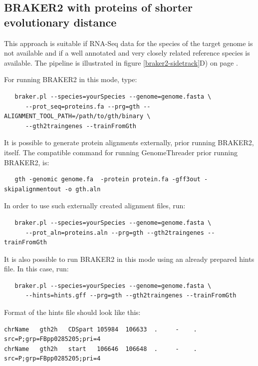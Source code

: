 \documentclass[a4paper,10pt]{report}
\begin{document}
\subsection{BRAKER2 with proteins of shorter evolutionary distance}\label{prot-in}

This approach is suitable if RNA-Seq data for the species of the target genome is not available and if a well annotated and very closely related reference species is available. The pipeline is illustrated in figure \ref{braker2-sidetrack}D) on page \pageref{braker2-sidetrack}.

For running BRAKER2 in this mode, type:

\begin{verbatim}
   braker.pl --species=yourSpecies --genome=genome.fasta \
      --prot_seq=proteins.fa --prg=gth --ALIGNMENT_TOOL_PATH=/path/to/gth/binary \
      --gth2traingenes --trainFromGth
\end{verbatim}

It is possible to generate protein alignments externally, prior running BRAKER2, itself. The compatible command for running GenomeThreader prior running BRAKER2, is:

\begin{verbatim}
   gth -genomic genome.fa  -protein protein.fa -gff3out -skipalignmentout -o gth.aln
\end{verbatim}


In order to use such externally created alignment files, run:

\begin{verbatim}
   braker.pl --species=yourSpecies --genome=genome.fasta \
      --prot_aln=proteins.aln --prg=gth --gth2traingenes --trainFromGth
\end{verbatim}

It is also possible to run BRAKER2 in this mode using an already prepared hints file. In this case, run:

\begin{verbatim}
   braker.pl --species=yourSpecies --genome=genome.fasta \
      --hints=hints.gff --prg=gth --gth2traingenes --trainFromGth
\end{verbatim}

Format of the hints file should look like this:

\begin{verbatim}
chrName   gth2h   CDSpart 105984  106633  .     -    .    src=P;grp=FBpp0285205;pri=4
chrName   gth2h   start   106646  106648  .     -    .    src=P;grp=FBpp0285205;pri=4
\end{verbatim}
\end{document}
